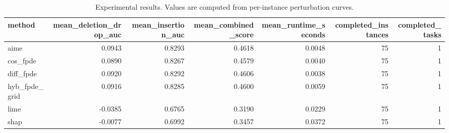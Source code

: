 \begin{table}[t]
\caption{Experimental results. Values are computed from per-instance perturbation curves.}
\label{tab:main_results_computed}
\centering
\begin{tabular}{lrrrrrr}
\toprule
method & mean\_deletion\_drop\_auc & mean\_insertion\_auc & mean\_combined\_score & mean\_runtime\_seconds & completed\_instances & completed\_tasks \\
\midrule
aime & 0.0943 & 0.8293 & 0.4618 & 0.0048 & 75 & 1 \\
cos\_fpde & 0.0890 & 0.8267 & 0.4579 & 0.0040 & 75 & 1 \\
diff\_fpde & 0.0920 & 0.8292 & 0.4606 & 0.0038 & 75 & 1 \\
hyb\_fpde\_grid & 0.0916 & 0.8285 & 0.4600 & 0.0059 & 75 & 1 \\
lime & -0.0385 & 0.6765 & 0.3190 & 0.0229 & 75 & 1 \\
shap & -0.0077 & 0.6992 & 0.3457 & 0.0372 & 75 & 1 \\
\bottomrule
\end{tabular}

\end{table}
